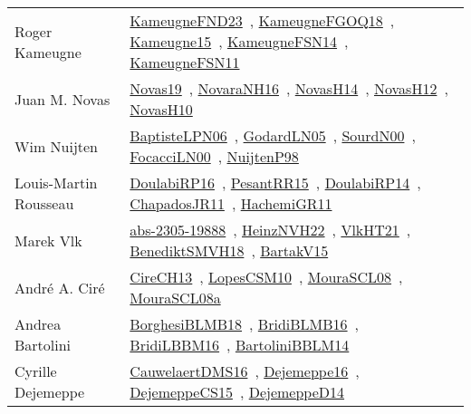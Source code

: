 {\begin{longtable}{p{4cm}p{20cm}}
Roger Kameugne & \href{papers/KameugneFND23.pdf}{KameugneFND23}~\cite{KameugneFND23}, \href{papers/KameugneFGOQ18.pdf}{KameugneFGOQ18}~\cite{KameugneFGOQ18}, \href{articles/Kameugne15.pdf}{Kameugne15}~\cite{Kameugne15}, \href{articles/KameugneFSN14.pdf}{KameugneFSN14}~\cite{KameugneFSN14}, \href{papers/KameugneFSN11.pdf}{KameugneFSN11}~\cite{KameugneFSN11}\\
Juan M. Novas & \href{articles/Novas19.pdf}{Novas19}~\cite{Novas19}, \href{articles/NovaraNH16.pdf}{NovaraNH16}~\cite{NovaraNH16}, \href{articles/NovasH14.pdf}{NovasH14}~\cite{NovasH14}, \href{articles/NovasH12.pdf}{NovasH12}~\cite{NovasH12}, \href{articles/NovasH10.pdf}{NovasH10}~\cite{NovasH10}\\
Wim Nuijten & \href{}{BaptisteLPN06}~\cite{BaptisteLPN06}, \href{}{GodardLN05}~\cite{GodardLN05}, \href{}{SourdN00}~\cite{SourdN00}, \href{papers/FocacciLN00.pdf}{FocacciLN00}~\cite{FocacciLN00}, \href{articles/NuijtenP98.pdf}{NuijtenP98}~\cite{NuijtenP98}\\
Louis{-}Martin Rousseau & \href{}{DoulabiRP16}~\cite{DoulabiRP16}, \href{papers/PesantRR15.pdf}{PesantRR15}~\cite{PesantRR15}, \href{papers/DoulabiRP14.pdf}{DoulabiRP14}~\cite{DoulabiRP14}, \href{papers/ChapadosJR11.pdf}{ChapadosJR11}~\cite{ChapadosJR11}, \href{articles/HachemiGR11.pdf}{HachemiGR11}~\cite{HachemiGR11}\\
Marek Vlk & \href{articles/abs-2305-19888.pdf}{abs-2305-19888}~\cite{abs-2305-19888}, \href{articles/HeinzNVH22.pdf}{HeinzNVH22}~\cite{HeinzNVH22}, \href{articles/VlkHT21.pdf}{VlkHT21}~\cite{VlkHT21}, \href{papers/BenediktSMVH18.pdf}{BenediktSMVH18}~\cite{BenediktSMVH18}, \href{}{BartakV15}~\cite{BartakV15}\\
Andr{\'{e}} A. Cir{\'{e}} & \href{papers/CireCH13.pdf}{CireCH13}~\cite{CireCH13}, \href{articles/LopesCSM10.pdf}{LopesCSM10}~\cite{LopesCSM10}, \href{papers/MouraSCL08.pdf}{MouraSCL08}~\cite{MouraSCL08}, \href{papers/MouraSCL08a.pdf}{MouraSCL08a}~\cite{MouraSCL08a}\\
Andrea Bartolini & \href{articles/BorghesiBLMB18.pdf}{BorghesiBLMB18}~\cite{BorghesiBLMB18}, \href{articles/BridiBLMB16.pdf}{BridiBLMB16}~\cite{BridiBLMB16}, \href{papers/BridiLBBM16.pdf}{BridiLBBM16}~\cite{BridiLBBM16}, \href{papers/BartoliniBBLM14.pdf}{BartoliniBBLM14}~\cite{BartoliniBBLM14}\\
Cyrille Dejemeppe & \href{papers/CauwelaertDMS16.pdf}{CauwelaertDMS16}~\cite{CauwelaertDMS16}, \href{}{Dejemeppe16}~\cite{Dejemeppe16}, \href{papers/DejemeppeCS15.pdf}{DejemeppeCS15}~\cite{DejemeppeCS15}, \href{papers/DejemeppeD14.pdf}{DejemeppeD14}~\cite{DejemeppeD14}\\

\end{longtable}}
